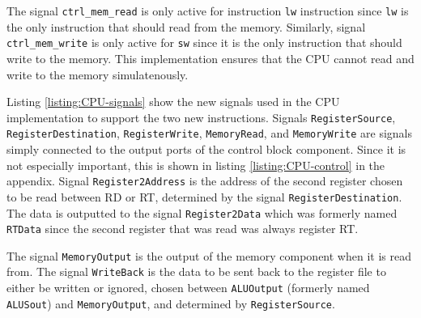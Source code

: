 \documentclass[11pt]{report}
\begin{document}
The signal \verb|ctrl_mem_read| is only active for instruction \verb|lw| instruction since \verb|lw|
is the only instruction that should read from the memory. Similarly, signal \verb|ctrl_mem_write| is
only active for \verb|sw| since it is the only instruction that should write to the memory. This
implementation ensures that the CPU cannot read and write to the memory simulatenously.


Listing \ref{listing:CPU-signals} show the new signals used in the CPU implementation to support the
two new instructions. Signals \verb|RegisterSource|, \verb|RegisterDestination|,
\verb|RegisterWrite|, \verb|MemoryRead|, and \verb|MemoryWrite| are signals simply connected to the
output ports of the control block component. Since it is not especially important, this is shown in
listing \ref{listing:CPU-control} in the appendix. Signal \verb|Register2Address| is the address of
the second register chosen to be read between RD or RT, determined by the signal
\verb|RegisterDestination|. The data is outputted to the signal \verb|Register2Data| which was
formerly named \verb|RTData| since the second register that was read was always register RT.

The signal \verb|MemoryOutput| is the output of the memory component when it is read from. The
signal \verb|WriteBack| is the data to be sent back to the register file to either be written or
ignored, chosen between \verb|ALUOutput| (formerly named \verb|ALUSout|) and \verb|MemoryOutput|,
and determined by \verb|RegisterSource|.

\end{document}

